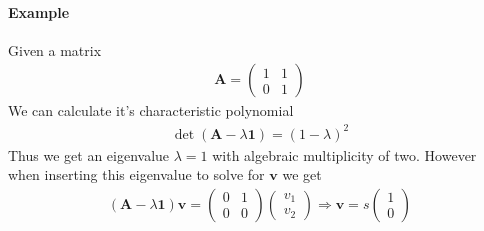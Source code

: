\paragraph{Example} Given a matrix
\begin{align}
\bm{A} = 
\begin{pmatrix}
    1 & 1 \\
    0 & 1
\end{pmatrix}
\end{align}
We can calculate it’s characteristic polynomial
\begin{align}
    \det(\bm{A} - \lambda \bm{1}) = (1-\lambda)^2
\end{align}
Thus we get an eigenvalue $\lambda = 1$ with algebraic multiplicity of two. However when inserting this eigenvalue to
solve for $\bm{v}$ we get
\begin{align}
    (\bm{A} - \lambda \bm{1})  \bm{v} =  \begin{pmatrix}
        0 & 1 \\
        0 & 0
    \end{pmatrix}
    \begin{pmatrix}
        v_1 \\
        v_2
    \end{pmatrix}
    \Rightarrow \bm{v} = s \begin{pmatrix}
        1 \\
        0
    \end{pmatrix}
\end{align}

